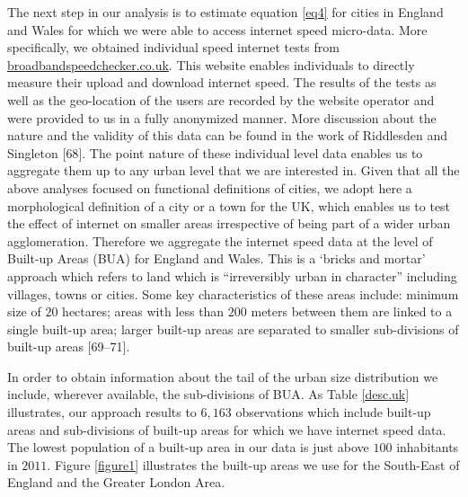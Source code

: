 \documentclass[10pt,letterpaper]{article}
\begin{document}
The next step in our analysis is to estimate equation \ref{eq4} for
cities in England and Wales for which we were able to access internet
speed micro-data. More specifically, we obtained individual speed
internet tests from \url{broadbandspeedchecker.co.uk}. This website
enables individuals to directly measure their upload and download
internet speed. The results of the tests as well as the geo-location of
the users are recorded by the website operator and were provided to us
in a fully anonymized manner. More discussion about the nature and the
validity of this data can be found in the work of Riddlesden and
Singleton {[}68{]}. The point nature of these individual level data
enables us to aggregate them up to any urban level that we are
interested in. Given that all the above analyses focused on functional
definitions of cities, we adopt here a morphological definition of a
city or a town for the UK, which enables us to test the effect of
internet on smaller areas irrespective of being part of a wider urban
agglomeration. Therefore we aggregate the internet speed data at the
level of Built-up Areas (BUA) for England and Wales. This is a `bricks
and mortar' approach which refers to land which is ``irreversibly urban
in character'' including villages, towns or cities. Some key
characteristics of these areas include: minimum size of \(20\) hectares;
areas with less than \(200\) meters between them are linked to a single
built-up area; larger built-up areas are separated to smaller
sub-divisions of built-up areas {[}69--71{]}.

In order to obtain information about the tail of the urban size
distribution we include, wherever available, the sub-divisions of BUA.
As Table \ref{desc.uk} illustrates, our approach results to \(6,163\)
observations which include built-up areas and sub-divisions of built-up
areas for which we have internet speed data. The lowest population of a
built-up area in our data is just above \(100\) inhabitants in \(2011\).
Figure \ref{figure1} illustrates the built-up areas we use for the
South-East of England and the Greater London Area.
\end{document}
